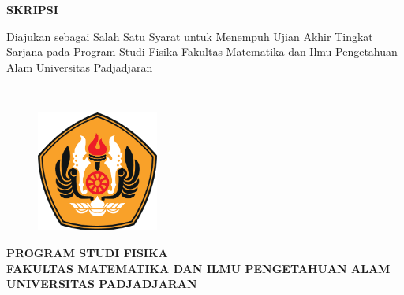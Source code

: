 \begin{titlepage}
    \thispagestyle{empty}
    \begin{center}
        \begin{large}
            \begin{spacing}{1}
                \textbf{\MakeUppercase{\draftTitle}}
            \end{spacing}
        \end{large}

        \vspace{2cm}
        \textbf{SKRIPSI}

        \vspace{1cm}
        Diajukan sebagai Salah Satu Syarat untuk Menempuh Ujian Akhir Tingkat Sarjana pada Program Studi Fisika Fakultas Matematika dan Ilmu Pengetahuan Alam Universitas Padjadjaran
        
        \vspace{1cm}
        \textbf{\MakeUppercase{\fullName\\
        \NPM}}

        \vspace{2cm}
        \begin{figure}[h]
            \centering
            \includegraphics[width=4cm]{Images/logo-unpad-fc.png}
            \label{fig:unpadlogo}
        \end{figure}

        \vspace{2cm}
        \textbf{PROGRAM STUDI FISIKA\\
        FAKULTAS MATEMATIKA DAN ILMU PENGETAHUAN ALAM\\
        UNIVERSITAS PADJADJARAN\\}

        \vspace{\baselineskip}
        \textbf{\large \the\year{}}
    \end{center}
\end{titlepage}